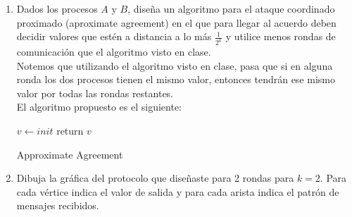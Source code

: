 \documentclass[12pt,a4paper]{report}
\begin{document}
\begin{enumerate}
	\item {
		Dados los procesos $A$ y $B$, diseña un algoritmo para el ataque coordinado
		proximado (aproximate agreement) en el que para llegar al acuerdo deben decidir
		valores que estén a distancia a lo más $\frac{1}{2^k}$ y utilice menos rondas
		de comunicación que el algoritmo visto en clase.\\

		Notemos que utilizando el algoritmo visto en clase, pasa que si en alguna
		ronda los dos procesos tienen el mismo valor, entonces tendrán ese mismo
		valor por todas las rondas restantes.\\

		El algoritmo propuesto es el siguiente:\\

		\IncMargin{1em}
		\begin{algorithm}
			\BlankLine
			$v \leftarrow init$ \;
			return $v$\;
			\caption{Approximate Agreement}
		\end{algorithm}\DecMargin{1em}
	}

	\item {
		Dibuja la gráfica del protocolo que diseñaste para 2 rondas para $k = 2$.
		Para cada vértice indica el valor de salida y para cada arista indica el
		patrón de mensajes recibidos.\\\\

	}


\end{enumerate}
\end{document}
